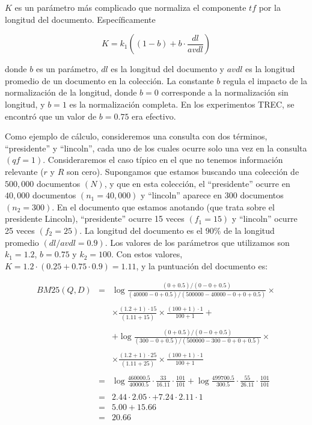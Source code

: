 $K$ es un parámetro más complicado que normaliza el componente $tf$ por la longitud del documento. Específicamente

$$K = k_1((1-b) + b\cdot \frac{dl}{avdl})$$

donde $b$ es un parámetro, $dl$ es la longitud del documento y $avdl$ es la longitud promedio de un documento en la colección. La constante $b$ regula el impacto de la normalización de la longitud, donde $b = 0$ corresponde a la normalización sin longitud, y $b = 1$ es la normalización completa. En los experimentos TREC, se encontró que un valor de $b = 0.75$ era efectivo.

Como ejemplo de cálculo, consideremos una consulta con dos términos, ``presidente'' y ``lincoln'', cada uno de los cuales ocurre solo una vez en la consulta $(qf = 1)$. Consideraremos el caso típico en el que no tenemos información relevante ($r$ y $R$ son cero). Supongamos que estamos buscando una colección de $500,000$ documentos $(N)$, y que en esta colección, el ``presidente'' ocurre en $40,000$ documentos $(n_1 = 40, 000)$
y ``lincoln'' aparece en 300 documentos $(n_2 = 300)$. En el documento que estamos anotando (que trata sobre el presidente Lincoln), ``presidente'' ocurre 15 veces $(f_1 = 15)$ y ``lincoln'' ocurre 25 veces $(f_2 = 25)$. La longitud del documento es el $90\%$ de la longitud promedio $(dl / avdl = 0.9)$. Los valores de los parámetros que utilizamos son $k_1 = 1.2$, $b = 0.75$ y $k_2 = 100$. Con estos valores, $K = 1.2 \cdot (0.25 + 0.75 \cdot 0.9) = 1.11$, y la puntuación del documento es:

$$\begin{array}{lll}
	BM25(Q,D) & = & \log{\frac{(0 + 0.5)/(0 - 0 + 0.5)}{(40000 - 0 + 0.5)/(500000 - 40000 - 0 + 0 + 0.5)}}\times \\
	\\
	&  & \times\frac{(1.2 + 1)\cdot 15}{(1.11 + 15)}\times \frac{(100 + 1)\cdot 1}{100 + 1} + \\
	\\
	&  & + \log{\frac{(0 + 0.5)/(0 - 0 + 0.5)}{(300 - 0 + 0.5)/(500000 - 300 - 0 + 0 + 0.5)}}\times \\
	\\
	&  & \times\frac{(1.2 + 1)\cdot 25}{(1.11 + 25)}\times \frac{(100 + 1)\cdot 1}{100 + 1} \\
	\\
	& = & \log{\frac{460000.5}{40000.5}} \cdot \frac{33}{16.11} \cdot \frac{101}{101} + \log{\frac{499700.5}{300.5}} \cdot \frac{55}{26.11} \cdot \frac{101}{101} \\
	\\
	& = & 2.44 \cdot 2.05 \cdot + 7.24 \cdot 2.11 \cdot 1 \\
	& = & 5.00 + 15.66 \\
	& = &20.66 
\end{array}$$

